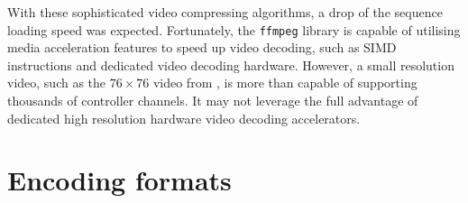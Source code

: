 With these sophisticated video compressing algorithms, a drop of the sequence loading speed was expected. Fortunately, the \texttt{ffmpeg} library is capable of utilising media acceleration features to speed up video decoding, such as SIMD instructions and dedicated video decoding hardware. However, a small resolution video, such as the $76 \times 76$ video from , is more than capable of supporting thousands of controller channels. It may not leverage the full advantage of dedicated high resolution hardware video decoding accelerators.

\section{Encoding formats}

\begin{figure}[t]
  \centering
  \hfil
  \hfil
  \\

\end{figure}
